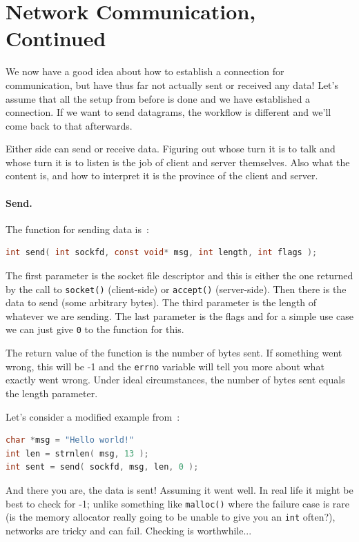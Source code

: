 \documentclass[a4paper]{report}
\begin{document}
\section*{Network Communication, Continued}

We now have a good idea about how to establish a connection for communication, but have thus far not actually sent or received any data! Let's assume that all the setup from before is done and we have established a connection. If we want to send datagrams, the workflow is different and we'll come back to that afterwards.

Either side can send or receive data. Figuring out whose turn it is to talk and whose turn it is to listen is the job of client and server themselves. Also what the content is, and how to interpret it is the province of the client and server.

\paragraph{Send.} The function for sending data is~\cite{apunix}:
\begin{lstlisting}[language=C]
int send( int sockfd, const void* msg, int length, int flags );
\end{lstlisting}

The first parameter is the socket file descriptor and this is either the one returned by the call to \texttt{socket()} (client-side) or \texttt{accept()} (server-side). Then there is the data to send (some arbitrary bytes). The third parameter is the length of whatever we are sending. The last parameter is the flags and for a simple use case we can just give \texttt{0} to the function for this.

The return value of the function is the number of bytes sent. If something went wrong, this will be -1 and the \texttt{errno} variable will tell you more about what exactly went wrong. Under ideal circumstances, the number of bytes sent equals the length parameter.

Let's consider a modified example from~\cite{getaddrinfo}:
\begin{lstlisting}[language=C]
char *msg = "Hello world!"
int len = strnlen( msg, 13 );
int sent = send( sockfd, msg, len, 0 );
\end{lstlisting}

And there you are, the data is sent! Assuming it went well. In real life it might be best to check for -1; unlike something like \texttt{malloc()} where the failure case is rare (is the memory allocator really going to be unable to give you an \texttt{int} often?), networks are tricky and can fail. Checking is worthwhile...
\end{document}
